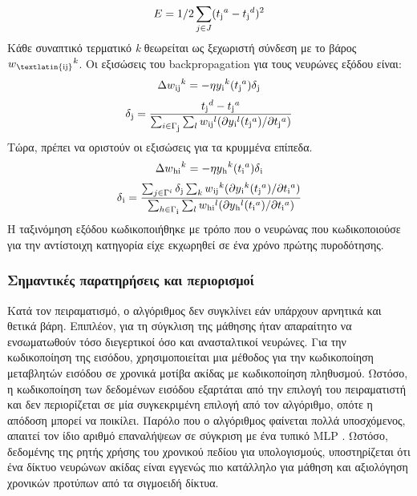 \documentclass[12pt]{report}
\begin{document}
\begin{equation}
    E=1/2\sum_{j\in J}(t\textsubscript{j}^a-t\textsubscript{j}^d)^2
\end{equation}
Κάθε συναπτικό τερματικό \textit{\textlatin{k}} θεωρείται ως ξεχωριστή σύνδεση με το βάρος \(w\textsubscript{\textlatin{ij}}^k\). Οι εξισώσεις του \textlatin{backpropagation} για τους νευρώνες εξόδου είναι:
\begin{equation}
    \Delta w\textsubscript{ij}^k=-\eta y\textsubscript{i}^k (t\textsubscript{j}^a) \delta \textsubscript{j}
\end{equation}
\begin{equation}
\delta \textsubscript{j} = \frac { t\textsubscript{j}^d-t\textsubscript{j}^a}  {\sum_{i \in \Gamma \textsubscript{j} } \sum_{l} w \textsubscript{ij}^l(\partial y \textsubscript{i}^l(t \textsubscript{j}^a) / \partial t \textsubscript{j}^a)}
\end{equation}
Τώρα, πρέπει να οριστούν οι εξισώσεις για τα κρυμμένα επίπεδα.
\begin{equation}
    \Delta w\textsubscript{hi}^k=-\eta y\textsubscript{h}^k (t\textsubscript{i}^a) \delta \textsubscript{i}
\end{equation}
\begin{equation}
\delta \textsubscript{i} = \frac { \sum_{j \in \Gamma^i  }\delta\textsubscript{j}\sum_{k} w \textsubscript{ij}^k(\partial y \textsubscript{i}^k(t \textsubscript{j}^a) / \partial t \textsubscript{i}^a)}
{ \sum_{h \in \Gamma \textsubscript{i} }\sum_{l} w \textsubscript{hi}^l(\partial y \textsubscript{h}^l(t \textsubscript{i}^a) / \partial t \textsubscript{i}^a)}
\end{equation}
Η ταξινόμηση εξόδου κωδικοποιήθηκε με τρόπο που ο νευρώνας που κωδικοποιούσε για την αντίστοιχη κατηγορία είχε εκχωρηθεί σε ένα χρόνο πρώτης πυροδότησης.

\subsubsection{Σημαντικές παρατηρήσεις και περιορισμοί}

Κατά τον πειραματισμό, ο αλγόριθμος δεν συγκλίνει εάν υπάρχουν αρνητικά και θετικά βάρη. Επιπλέον, για τη σύγκλιση της μάθησης ήταν απαραίτητο να ενσωματωθούν τόσο διεγερτικοί όσο και ανασταλτικοί νευρώνες. Για την κωδικοποίηση της εισόδου, χρησιμοποιείται μια μέθοδος για την κωδικοποίηση μεταβλητών εισόδου σε χρονικά μοτίβα ακίδας με κωδικοποίηση πληθυσμού. Ωστόσο, η κωδικοποίηση των δεδομένων εισόδου εξαρτάται από την επιλογή του πειραματιστή και δεν περιορίζεται σε μία συγκεκριμένη επιλογή από τον αλγόριθμο, οπότε η απόδοση μπορεί να ποικίλει. Παρόλο που ο αλγόριθμος φαίνεται πολλά υποσχόμενος, απαιτεί τον ίδιο αριθμό επαναλήψεων σε σύγκριση με ένα τυπικό \textlatin{MLP} . Ωστόσο, δεδομένης της ρητής χρήσης του χρονικού πεδίου για υπολογισμούς, υποστηρίζεται ότι ένα δίκτυο νευρώνων ακίδας είναι εγγενώς πιο κατάλληλο για μάθηση και αξιολόγηση χρονικών προτύπων από τα σιγμοειδή δίκτυα.
\end{document}
